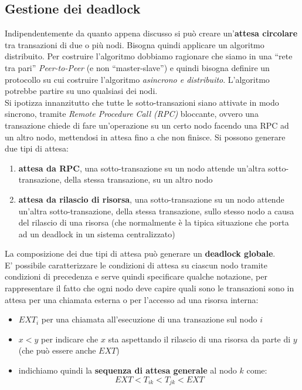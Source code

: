\documentclass[a4paper,12pt, oneside]{book}
\begin{document}
\subsection{Gestione dei deadlock}
Indipendentemente da quanto appena discusso si può creare un'\textbf{attesa
  circolare} tra transazioni di due o più nodi. Bisogna quindi applicare un
algoritmo distribuito. Per costruire l'algoritmo dobbiamo ragionare che siamo in
una ``rete tra pari'' \textit{Peer-to-Peer} (e non ``master-slave'') e quindi
bisogna definire un protocollo su cui costruire l'algoritmo \textit{asincrono e
  distribuito}. L'algoritmo potrebbe partire su uno qualsiasi dei nodi.\\
Si ipotizza innanzitutto che tutte le sotto-transazioni siano attivate in modo
sincrono, tramite \textit{Remote Procedure Call (RPC)} bloccante, ovvero una
transazione chiede di fare un'operazione su un certo nodo facendo una RPC ad un
altro nodo, mettendosi in attesa fino a che non finisce. Si possono generare due
tipi di attesa:
\begin{enumerate}
  \item \textbf{attesa da RPC}, una sotto-transazione su un nodo attende
  un'altra sotto-transazione, della stessa transazione, su un altro nodo
  \item \textbf{attesa da rilascio di risorsa}, una sotto-transazione su un nodo
  attende un'altra sotto-transazione, della stessa transazione, sullo stesso
  nodo a causa del rilascio di una risorsa (che normalmente è la tipica
  situazione che porta ad un deadlock in un sistema centralizzato)
\end{enumerate}
La composizione dei due tipi di attesa può generare un \textbf{deadlock
  globale}. \\
E’ possibile caratterizzare le condizioni di attesa su ciascun nodo tramite
condizioni di precedenza e serve quindi specificare qualche notazione, per
rappresentare il fatto che ogni nodo deve capire quali sono le transazioni sono
in attesa per una chiamata esterna o per l'accesso ad una risorsa interna:
\begin{itemize}
  \item $EXT_i$ per una chiamata all'esecuzione di una transazione sul nodo $i$
  \item $x < y$ per indicare che $x$ sta aspettando il rilascio di una risorsa
  da parte di $y$ (che può essere anche $EXT$)
  \item indichiamo quindi la \textbf{sequenza di attesa generale} al nodo $k$
  come: 
  \[EXT<T_{ik}<T_{jk}<EXT\]
\end{itemize}
\end{document}
